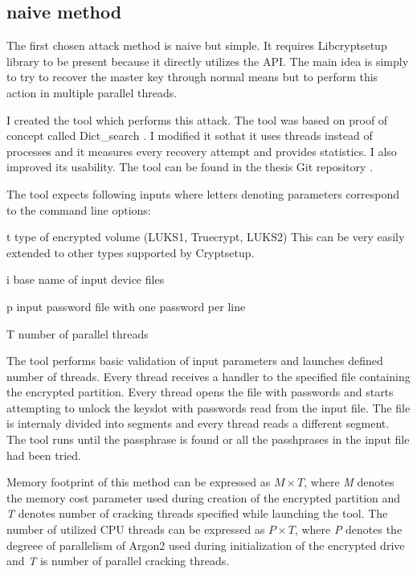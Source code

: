 \documentclass[nolof]{fithesis3}
\begin{document}
\subsection{naive method}
\label{subsec:naive}
The first chosen attack method is naive but simple. It requires Libcryptsetup library to be present because it directly utilizes the API. The main idea is simply to try to recover the master key through normal means but to perform this action in multiple parallel threads.

I created the tool which performs this attack. The tool was based on proof of concept called Dict\_search \parencite{cryptsetupdictsearch}.  I modified it sothat it uses threads instead of processes and it measures every recovery attempt and provides statistics. I also improved its usability. The tool can be found in the thesis Git repository \parencite{thesisrepo}.


The tool expects following inputs where letters denoting parameters correspond to the command line options:

\begin{description}
\item{t} type of encrypted volume (LUKS1, Truecrypt, LUKS2) This can be very easily extended to other types supported by Cryptsetup.

\item{i} base name of input device files

\item{p} input password file with one password per line

\item{T} number of parallel threads
\end{description}

The tool performs basic validation of input parameters and launches defined number of threads. Every thread receives a handler to the specified file containing the encrypted partition. Every thread opens the file with passwords and starts attempting to unlock the keyslot with passwords read from the input file. The file is internaly divided into segments and every thread reads a different segment. The tool runs until the passphrase is found or all the passhprases in the input file had been tried.

Memory footprint of this method can be expressed as $M \times T$, where \emph{M} denotes the memory cost parameter used during creation of the encrypted partition and \emph{T} denotes number of cracking threads specified while launching the tool. The number of utilized CPU threads can be expressed as $P \times T$, where \emph{P} denotes the degreee of parallelism of Argon2 used during initialization of the encrypted drive and \emph{T} is number of parallel cracking threads.
\end{document}

